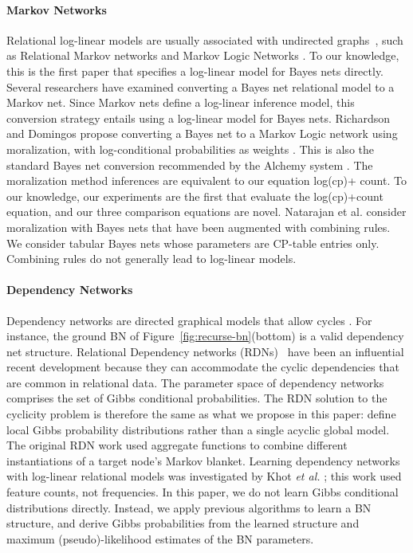 \documentclass[twoside,11pt]{article}
\begin{document}
\paragraph{Markov Networks} Relational log-linear models
are usually associated with undirected graphs~\cite{Sutton2007}, such as Relational Markov networks \cite{Taskar2002} and Markov Logic Networks \cite{Domingos2009}. To our knowledge, this is the first paper that specifies a log-linear model for Bayes nets directly. Several researchers have examined converting a Bayes net relational model to a Markov net. Since Markov nets define a log-linear inference model, this conversion strategy entails using a log-linear model for Bayes nets. 
Richardson and Domingos propose converting a Bayes net to a Markov Logic network using moralization, with log-conditional probabilities as weights \cite{Domingos2007}. 
This is also the standard Bayes net conversion recommended by the Alchemy system \cite{bib:bayes-convert}. 
The moralization method inferences are equivalent to our equation log(cp)+ count. 
To our knowledge, our experiments are the first that evaluate the log(cp)+count equation, and our three comparison equations are novel. Natarajan et al. \cite{Natarajan2010} consider moralization with Bayes nets that have been augmented with combining rules.
We consider tabular Bayes nets whose parameters are CP-table entries only. 
Combining rules do not generally lead to log-linear models. 
 
\paragraph{Dependency Networks} Dependency networks are directed graphical models that allow cycles \cite{Heckerman2000}. For instance, the ground BN of Figure~\ref{fig:recurse-bn}(bottom) is a valid dependency net structure. Relational Dependency networks (RDNs)~\cite{Neville2007} have been an influential recent development because they can accommodate the cyclic dependencies that are common in relational data. The parameter space of dependency networks comprises the set of Gibbs conditional probabilities. The RDN solution to the cyclicity problem is therefore the same as what we propose in this paper: define local Gibbs probability distributions rather than a single acyclic global model. The original RDN work used aggregate functions to combine different instantiations of a target node's Markov blanket. Learning dependency networks with log-linear relational models was investigated by Khot {\em et al.} \cite{Khot2011}; this work used feature counts, not frequencies. In this paper, we do not learn Gibbs conditional distributions directly. Instead, we apply previous algorithms
to learn a BN structure, and derive Gibbs probabilities from the learned structure and maximum (pseudo)-likelihood estimates of the BN parameters.
\end{document}
